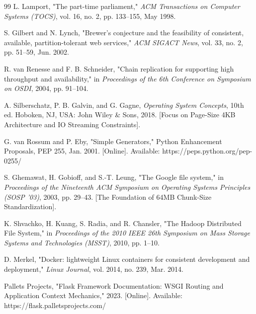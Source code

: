 \begin{thebibliography}{99}
L. Lamport, 
"The part-time parliament," 
\textit{ACM Transactions on Computer Systems (TOCS)}, 
vol. 16, no. 2, pp. 133--155, May 1998.

S. Gilbert and N. Lynch, 
"Brewer's conjecture and the feasibility of consistent, available, partition-tolerant web services," 
\textit{ACM SIGACT News}, vol. 33, no. 2, pp. 51--59, Jun. 2002.

R. van Renesse and F. B. Schneider, 
"Chain replication for supporting high throughput and availability," 
in \textit{Proceedings of the 6th Conference on Symposium on OSDI}, 
2004, pp. 91--104.

A. Silberschatz, P. B. Galvin, and G. Gagne, 
\textit{Operating System Concepts}, 10th ed. 
Hoboken, NJ, USA: John Wiley \& Sons, 2018. [Focus on Page-Size 4KB Architecture and IO Streaming Constraints].

G. van Rossum and P. Eby, 
"Simple Generators," 
Python Enhancement Proposals, PEP 255, Jan. 2001. [Online]. Available: https://peps.python.org/pep-0255/

S. Ghemawat, H. Gobioff, and S.-T. Leung, 
"The Google file system," 
in \textit{Proceedings of the Nineteenth ACM Symposium on Operating Systems Principles (SOSP '03)}, 
2003, pp. 29--43. [The Foundation of 64MB Chunk-Size Standardization].

K. Shvachko, H. Kuang, S. Radia, and R. Chansler, 
"The Hadoop Distributed File System," 
in \textit{Proceedings of the 2010 IEEE 26th Symposium on Mass Storage Systems and Technologies (MSST)}, 
2010, pp. 1--10.

D. Merkel, 
"Docker: lightweight Linux containers for consistent development and deployment," 
\textit{Linux Journal}, vol. 2014, no. 239, Mar. 2014.

Pallets Projects, 
"Flask Framework Documentation: WSGI Routing and Application Context Mechanics," 
2023. [Online]. Available: https://flask.palletsprojects.com/

\end{thebibliography}
